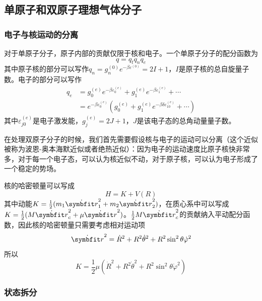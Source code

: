 \subsection{单原子和双原子理想气体分子} %
\label{sub:单原子和双原子理想气体分子}
\subsubsection{电子与核运动的分离}
对于单原子分子，原子内部的贡献仅限于核和电子。一个单原子分子的配分函数为\begin{equation}
    q=q_t q_n q_e
\end{equation}
其中原子核的部分可以写作$q_n=g_n^{(0)}e^{-\beta \varepsilon^{(0)}}=2I +1$，$I$是原子核的总自旋量子数。电子的部分可以写作\begin{equation}
\begin{aligned}
    q_e &=g_0^{(e)} e^{-\beta \varepsilon_0^{(e)}}+g_1^{(e)} e^{-\beta \varepsilon_1^{(e)}}+\cdots \\
    &=    e^{-\beta \varepsilon_0^{(e)}}\left(g_0^{(e)}+g_1^{(e)} e^{-\beta \delta \varepsilon_{10}^{(e)}}+\cdots\right)
\end{aligned}
\end{equation}
其中$\varepsilon_{j0}^{(e)}$是电子激发能，$g_j^{(e)}=2J+1$，$J$是该电子态的总角动量量子数。

在处理双原子分子的时候，我们首先需要假设核与电子的运动可以分离（这个近似被称为波恩-奥本海默近似或者绝热近似）：因为电子的运动速度比原子核快非常多，对于每一个电子态，可以认为核近似不动，对于原子核，可以认为电子形成了一个稳定的势场。

核的哈密顿量可以写成\begin{equation}
    H= K+V(R)
\end{equation}
其中动能$K=\frac{1}{2}(m_1 \dot{\bd{r}}_1^2 +m_2 \dot{\bd{r}}_2^2)$，在质心系中可以写成$K =\frac{1}{2}(M \dot{\bd{r}}_c^2 +\mu \dot{\bd{r}}^2)$。$\frac{1}{2}M \dot{\bd{r}}_c^2$的贡献纳入平动配分函数，因此核的哈密顿量只需要考虑相对运动项\begin{equation}
    \dot{\bd{r}}^2 =\dot{R}^2 + R^2 \dot\theta^2 +R^2 \sin^2\theta \dot\varphi^2
\end{equation}
所以\begin{equation}
    K=\frac{1}{2}\mu \left(\dot{R}^2 + R^2 \dot\theta^2 +R^2 \sin^2\theta \dot\varphi^2\right)
\end{equation}

\subsubsection{状态拆分}

